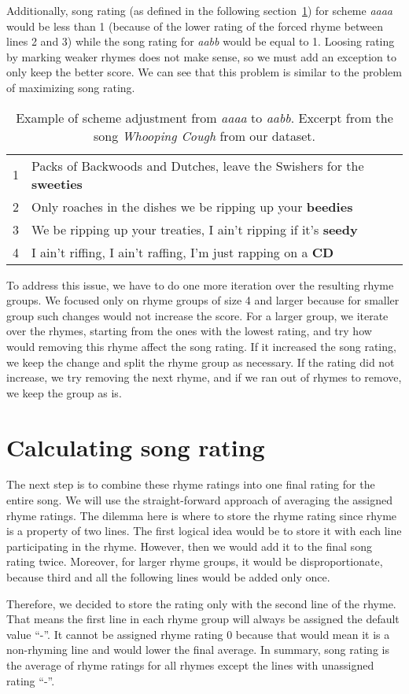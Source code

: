 Additionally, song rating (as defined in the following section~\ref{sec:song-rating}) for scheme \textit{aaaa} would be less than 1 (because of the lower rating of the forced rhyme between lines 2 and 3) while the song rating for \textit{aabb} would be equal to 1. Loosing rating by marking weaker rhymes does not make sense, so we must add an exception to only keep the better score. We can see that this problem is similar to the problem of maximizing song rating. 

\begin{table}
	\begin{tabular}{l l}
		1&Packs of Backwoods and Dutches, leave the Swishers for the \textbf{sweeties}  \\
		2&Only roaches in the dishes we be ripping up your \textbf{beedies}  \\
		3&We be ripping up your treaties, I ain't ripping if it's \textbf{seedy}  \\
		4&I ain't riffing, I ain't raffing, I'm just rapping on a \textbf{CD} \\
	\end{tabular}
	\caption[Scheme adjustment example.]{Example of scheme adjustment from \textit{aaaa} to \textit{aabb}. Excerpt from the song \textit{Whooping Cough} from  our dataset.}
	\label{scheme_adjustment}
\end{table}

To address this issue, we have to do one more iteration over the resulting rhyme groups. We focused only on rhyme groups of size 4 and larger because for smaller group such changes would not increase the score. For a larger group, we iterate over the rhymes, starting from the ones with the lowest rating, and try how would removing this rhyme affect the song rating. If it increased the song rating, we keep the change and split the rhyme group as necessary. If the rating did not increase, we try removing the next rhyme, and if we ran out of rhymes to remove, we keep the group as is.

\section{Calculating song rating}\label{sec:song-rating}
The next step is to combine these rhyme ratings into one final rating for the entire song. We will use the straight-forward approach of averaging the assigned rhyme ratings. The dilemma here is where to store the rhyme rating since rhyme is a property of two lines. The first logical idea would be to store it with each line participating in the rhyme. However, then we would add it to the final song rating twice. Moreover, for larger rhyme groups, it would be disproportionate, because third and all the following lines would be added only once. 

Therefore, we decided to store the rating only with the second line of the rhyme. That means the first line in each rhyme group will always be assigned the default value ``-''. It cannot be assigned rhyme rating 0 because that would mean it is a non-rhyming line and would lower the final average. In summary, song rating is the average of rhyme ratings for all rhymes except the lines with unassigned rating ``-''.
